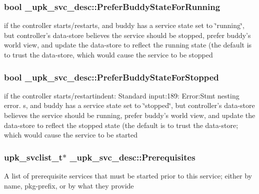 \subsubsection{\setlength{\rightskip}{0pt plus 5cm}bool \bf{\_\-upk\_\-svc\_\-desc::Prefer\-Buddy\-State\-For\-Running}\hspace{0.3cm}{\tt  [inherited]}}\label{group__config__impl_g556b0e1d1f94e966986e92da0d78ad2c}


if the controller starts/restarts, and buddy has a service state set to \char`\"{}running\char`\"{}, but controller's data-store believes the service should be stopped, prefer buddy's world view, and update the data-store to reflect the running state (the default is to trust the data-store, which would cause the service to be stopped 
\subsubsection{\setlength{\rightskip}{0pt plus 5cm}bool \bf{\_\-upk\_\-svc\_\-desc::Prefer\-Buddy\-State\-For\-Stopped}\hspace{0.3cm}{\tt  [inherited]}}\label{group__config__impl_g58dab9c2f5d291328e6ce09f88b78e5b}


if the controller starts/restartindent: Standard input:189: Error:Stmt nesting error. s, and buddy has a service state set to \char`\"{}stopped\char`\"{}, but controller's data-store believes the service should be running, prefer buddy's world view, and update the data-store to reflect the stopped state (the default is to trust the data-store; which would cause the service to be started 
\subsubsection{\setlength{\rightskip}{0pt plus 5cm}\bf{upk\_\-svclist\_\-t}$\ast$ \bf{\_\-upk\_\-svc\_\-desc::Prerequisites}\hspace{0.3cm}{\tt  [inherited]}}\label{group__config__impl_g73ea860ea568d7e9564fb9b104f7d5a2}


A list of prerequisite services that must be started prior to this service; either by name, pkg-prefix, or by what they provide 

